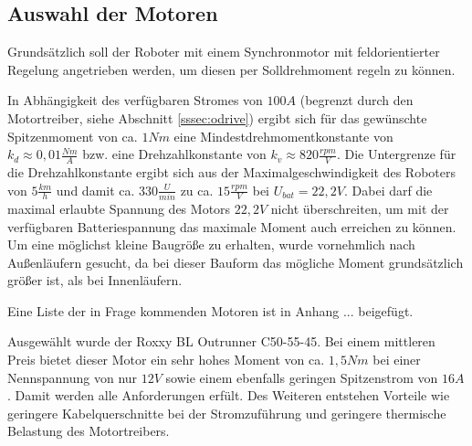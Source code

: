 \renewcommand{\autoren}{Stephan Morongowski}
\newpage
\subsection{Auswahl der Motoren}

Grundsätzlich soll der Roboter mit einem Synchronmotor mit feldorientierter Regelung angetrieben werden, um diesen per Solldrehmoment regeln zu können.

In Abhängigkeit des verfügbaren Stromes von \(100 A\) (begrenzt durch den Motortreiber, siehe Abschnitt \ref{sssec:odrive}) ergibt sich für das gewünschte Spitzenmoment von ca. \(1 Nm\) eine Mindestdrehmomentkonstante von \(k_d \approx 0,01 \frac{Nm}{A}\) bzw. eine Drehzahlkonstante von \(k_v \approx  820 \frac{rpm}{V}\). Die Untergrenze für die Drehzahlkonstante ergibt sich aus der Maximalgeschwindigkeit des Roboters von \(5 \frac{km}{h}\) und damit ca. \(330 \frac{U}{min}\) zu ca. \(15 \frac{rpm}{V}\) bei \(U_{bat} = 22,2 V\). Dabei darf die maximal erlaubte Spannung des Motors \(22,2 V\) nicht überschreiten, um mit der verfügbaren Batteriespannung das maximale Moment auch erreichen zu können. Um eine möglichst kleine Baugröße zu erhalten, wurde vornehmlich nach Außenläufern gesucht, da bei dieser Bauform das mögliche Moment grundsätzlich größer ist, als bei Innenläufern.

Eine Liste der in Frage kommenden Motoren ist in Anhang ... beigefügt.

\label{sssec:RoxxyMotor}
Ausgewählt wurde der \glqq Roxxy BL Outrunner C50-55-45\grqq{}. Bei einem mittleren Preis bietet dieser Motor ein sehr hohes Moment von ca. \(1,5 Nm\) bei einer Nennspannung von nur \(12 V\) sowie einem ebenfalls geringen Spitzenstrom von \(16 A\). Damit werden alle Anforderungen erfült. Des Weiteren entstehen Vorteile wie geringere Kabelquerschnitte bei der Stromzuführung und geringere thermische Belastung des Motortreibers.
\newpage
